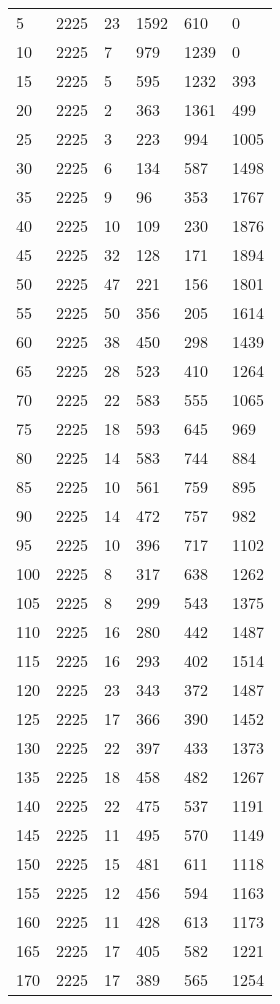 \begin{longtable}{|l|l|l|l|l|l|}
5 & 2225 & 23 & 1592 & 610 & 0 \\
10 & 2225 & 7 & 979 & 1239 & 0 \\
15 & 2225 & 5 & 595 & 1232 & 393 \\
20 & 2225 & 2 & 363 & 1361 & 499 \\
25 & 2225 & 3 & 223 & 994 & 1005 \\
30 & 2225 & 6 & 134 & 587 & 1498 \\
35 & 2225 & 9 & 96 & 353 & 1767 \\
40 & 2225 & 10 & 109 & 230 & 1876 \\
45 & 2225 & 32 & 128 & 171 & 1894 \\
50 & 2225 & 47 & 221 & 156 & 1801 \\
55 & 2225 & 50 & 356 & 205 & 1614 \\
60 & 2225 & 38 & 450 & 298 & 1439 \\
65 & 2225 & 28 & 523 & 410 & 1264 \\
70 & 2225 & 22 & 583 & 555 & 1065 \\
75 & 2225 & 18 & 593 & 645 & 969 \\
80 & 2225 & 14 & 583 & 744 & 884 \\
85 & 2225 & 10 & 561 & 759 & 895 \\
90 & 2225 & 14 & 472 & 757 & 982 \\
95 & 2225 & 10 & 396 & 717 & 1102 \\
100 & 2225 & 8 & 317 & 638 & 1262 \\
105 & 2225 & 8 & 299 & 543 & 1375 \\
110 & 2225 & 16 & 280 & 442 & 1487 \\
115 & 2225 & 16 & 293 & 402 & 1514 \\
120 & 2225 & 23 & 343 & 372 & 1487 \\
125 & 2225 & 17 & 366 & 390 & 1452 \\
130 & 2225 & 22 & 397 & 433 & 1373 \\
135 & 2225 & 18 & 458 & 482 & 1267 \\
140 & 2225 & 22 & 475 & 537 & 1191 \\
145 & 2225 & 11 & 495 & 570 & 1149 \\
150 & 2225 & 15 & 481 & 611 & 1118 \\
155 & 2225 & 12 & 456 & 594 & 1163 \\
160 & 2225 & 11 & 428 & 613 & 1173 \\
165 & 2225 & 17 & 405 & 582 & 1221 \\
170 & 2225 & 17 & 389 & 565 & 1254 \\

\end{longtable}
